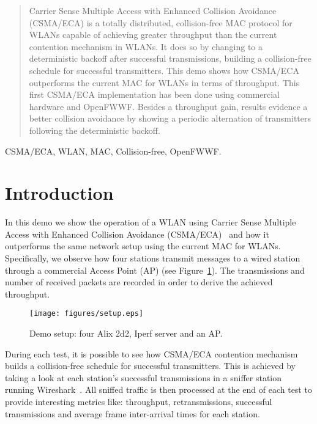 \documentclass[conference]{IEEEtran}
\begin{document}
\begin{abstract}
Carrier Sense Multiple Access with Enhanced Collision Avoidance (CSMA/ECA) is a totally distributed, collision-free MAC protocol for WLANs capable of achieving greater throughput than the current contention mechanism in WLANs. It does so by changing to a deterministic backoff after successful transmissions, building a collision-free schedule for successful transmitters. This demo shows how CSMA/ECA outperforms the current MAC for WLANs in terms of throughput. This first CSMA/ECA implementation has been done using commercial hardware and OpenFWWF. Besides a throughput gain, results evidence a better collision avoidance by showing a periodic alternation of transmitters following the deterministic backoff.

\end{abstract}

\begin{IEEEkeywords}
CSMA/ECA, WLAN, MAC, Collision-free, OpenFWWF.
\end{IEEEkeywords}

\maketitle

\section{Introduction}\label{intro}
In this demo we show the operation of a WLAN using Carrier Sense Multiple Access with Enhanced Collision Avoidance (CSMA/ECA)~\cite{barcelo2008lba} and how it outperforms the same network setup using the current MAC for WLANs. Specifically, we observe how four stations transmit messages to a wired station through a commercial Access Point (AP) (see Figure~\ref{fig:setup}). The transmissions and number of received packets are recorded in order to derive the achieved throughput.

	\begin{figure}[htbp]
		\centering
		\texttt{[image: figures/setup.eps]}
		\caption{Demo setup: four Alix 2d2, Iperf server and an AP.}
		\label{fig:setup}
	\end{figure}

During each test, it is possible to see how CSMA/ECA contention mechanism builds a collision-free schedule for successful transmitters. This is achieved by taking a look at each station's successful transmissions in a sniffer station running Wireshark~\cite{combs2007wireshark}. All sniffed traffic is then processed at the end of each test to provide interesting metrics like: throughput, retransmissions, successful transmissions and average frame inter-arrival times for each station.
\end{document}
